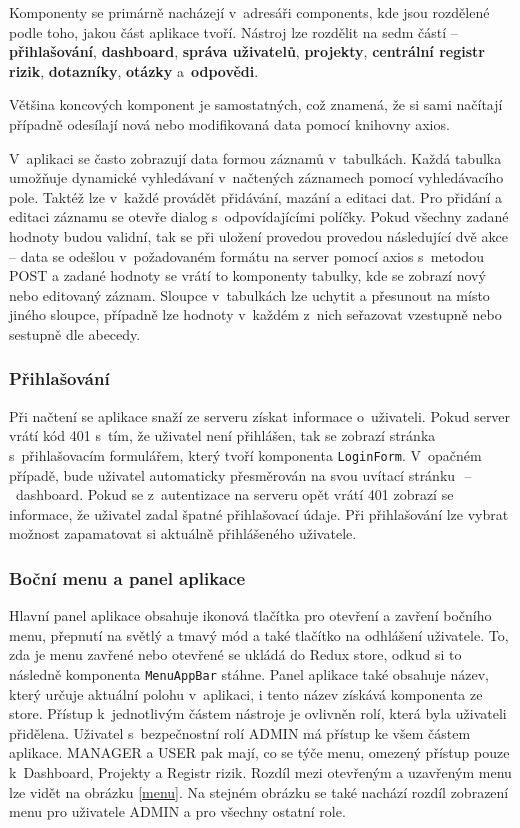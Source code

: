 Komponenty se primárně nacházejí v~adresáři components, kde jsou rozdělené podle toho, jakou část aplikace tvoří. Nástroj lze rozdělit na sedm částí – \textbf{přihlašování}, \textbf{dashboard}, \textbf{správa uživatelů}, \textbf{projekty}, \textbf{centrální registr rizik}, \textbf{dotazníky}, \textbf{otázky} a~\textbf{odpovědi}. 

Většina koncových komponent je samostatných, což znamená, že si sami načítají případně odesílají nová nebo modifikovaná data pomocí knihovny axios.

V~aplikaci se často zobrazují data formou záznamů v~tabulkách. Každá tabulka umožňuje dynamické vyhledávaní v~načtených záznamech pomocí vyhledávacího pole. Taktéž lze v~každé provádět přidávání, mazání a editaci dat. Pro přidání a editaci záznamu se otevře dialog s~odpovídajícími políčky. Pokud všechny zadané hodnoty budou validní, tak se při uložení provedou provedou následující dvě akce – data se odešlou v~požadovaném formátu na server pomocí axios s~metodou POST a zadané hodnoty se vrátí to komponenty tabulky, kde se zobrazí nový nebo editovaný záznam. Sloupce v~tabulkách lze uchytit a přesunout na místo jiného sloupce, případně lze hodnoty v~každém z~nich seřazovat vzestupně nebo sestupně dle abecedy.

\subsubsection *{Přihlašování}

Při načtení se aplikace snaží ze serveru získat informace o~uživateli.  Pokud server vrátí kód 401 s~tím, že uživatel není přihlášen, tak se zobrazí stránka s~přihlašovacím formulářem, který tvoří komponenta \texttt{LoginForm}. V~opačném případě, bude uživatel automaticky přesměrován na svou uvítací stránku~\,--\,~dashboard. Pokud se z~autentizace na serveru opět vrátí 401 zobrazí se informace, že uživatel zadal špatné přihlašovací údaje. Při přihlašování lze vybrat možnost zapamatovat si aktuálně přihlášeného uživatele.

\subsubsection *{Boční menu a panel aplikace}

Hlavní panel aplikace obsahuje ikonová tlačítka pro otevření a zavření bočního menu, přepnutí na světlý a tmavý mód a také tlačítko na odhlášení uživatele. To, zda je menu zavřené nebo otevřené se ukládá do Redux store, odkud si to následně komponenta \texttt{MenuAppBar} stáhne. Panel aplikace také obsahuje název, který určuje aktuální polohu v~aplikaci, i tento název získává komponenta ze store.
Přístup k~jednotlivým částem nástroje je ovlivněn rolí, která byla uživateli přidělena. Uživatel s~bezpečnostní rolí ADMIN má přístup ke všem částem aplikace. MANAGER a USER pak mají, co se týče menu, omezený přístup pouze k~Dashboard, Projekty a Registr rizik. Rozdíl mezi otevřeným a uzavřeným menu lze vidět na obrázku \ref{menu}. Na stejném obrázku se také nachází rozdíl zobrazení menu pro uživatele ADMIN a pro všechny ostatní role. 

